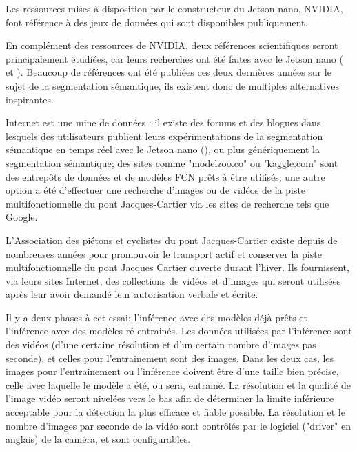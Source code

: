 ﻿\label{metho:data}
\par Les ressources mises à disposition par le constructeur du Jetson nano, NVIDIA, font référence à des jeux de données qui sont disponibles publiquement.
\par En complément des ressources de NVIDIA, deux références scientifiques seront principalement étudiées, car leurs recherches ont été faites avec le Jetson nano (\cite{nguyen_mavnet_2019} et \cite{chong_real-time_1992}). Beaucoup de références ont été publiées ces deux dernières années sur le sujet de la segmentation sémantique, ils existent donc de multiples alternatives inspirantes.
\par Internet est une mine de données : il existe des forums et des blogues dans lesquels des utilisateurs publient leurs expérimentations de la segmentation sémantique en temps réel avec le Jetson nano (\cite{dustin_realtime_2019}), ou plus génériquement la segmentation sémantique; des sites comme "modelzoo.co" ou "kaggle.com" sont des entrepôts de données et de modèles FCN prêts à être utilisés; une autre option a été d'effectuer une recherche d'images ou de vidéos de la piste multifonctionnelle du pont Jacques-Cartier via les sites de recherche tels que Google. 
\par L'Association des piétons et cyclistes du pont Jacques-Cartier existe depuis de nombreuses années pour promouvoir le transport actif et conserver la piste multifonctionnelle du pont Jacques Cartier ouverte durant l'hiver. Ils fournissent, via leurs sites Internet, des collections de vidéos et d'images qui seront utilisées après leur avoir demandé leur autorisation verbale et écrite. \cite{association_des_pietons_et_cyclistes_du_pont_jacques-cartier_pontjacques-cartier365com_2020} \cite{association_des_pietons_et_cyclistes_pont_jacques-cartier_flickr_2020}
\par Il y a deux phases à cet essai: l'inférence avec des modèles déjà prêts et l'inférence avec des modèles ré entrainés. Les données utilisées par l'inférence sont des vidéos (d'une certaine résolution et d'un certain nombre d'images pas seconde), et celles pour l'entrainement sont des images. Dans les deux cas, les images pour l'entrainement ou l'inférence doivent être d'une taille bien précise, celle avec laquelle le modèle a été, ou sera, entrainé. La résolution et la qualité de l'image vidéo seront nivelées vers le bas afin de déterminer la limite inférieure acceptable pour la détection la plus efficace et fiable possible. La résolution et le nombre d'images par seconde de la vidéo sont contrôlés par le logiciel ("driver" en anglais) de la caméra, et sont configurables. 
